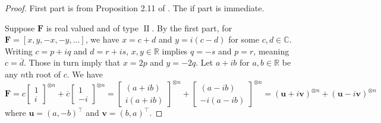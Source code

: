 \documentclass[11pt]{article}
\DeclareMathOperator{\typeii}{II}
\newcommand{\transpose}{^\intercal}
\begin{document}
\begin{proof}
  First part is from Proposition 2.11 of \cite{cai_complexity_2017}.
  The if part is immediate.

  Suppose $\mathbf{F}$ is real valued and of type $\typeii$. 
  By the first part, for $\mathbf{F} = [x, y, -x, -y, \ldots]$, we have
  $x = c + d$ and $y = i(c - d)$ for some $c, d \in \mathbb{C}$.
  Writing $c = p + iq$ and $d = r + is$, $x, y \in \mathbb{R}$ implies $q = -s$ and $p = r$, meaning $c = \overline{d}$.
  Those in turn imply that $x = 2p$ and $y = -2q$.
  Let $a + ib$ for $a, b \in \mathbb{R}$ be any $n$th root of $c$.
  We have
  \[
    \mathbf{F} = c \begin{bmatrix}
      1 \\ i
      \end{bmatrix}^{\otimes n} + \overline{c} \begin{bmatrix}
      1 \\ -i
      \end{bmatrix}^{\otimes n} = \begin{bmatrix}
      (a + ib) \\ i(a + ib)
      \end{bmatrix}^{\otimes n} + \begin{bmatrix}
      (a - ib) \\ -i(a - ib)
    \end{bmatrix}^{\otimes n} = (\mathbf{u} + i \mathbf{v})^{\otimes n} + (\mathbf{u} - i \mathbf{v})^{\otimes n}
  \]
  where $\mathbf{u} = (a, -b)\transpose$ and $\mathbf{v} = (b, a)\transpose$.
\end{proof}
\end{document}
